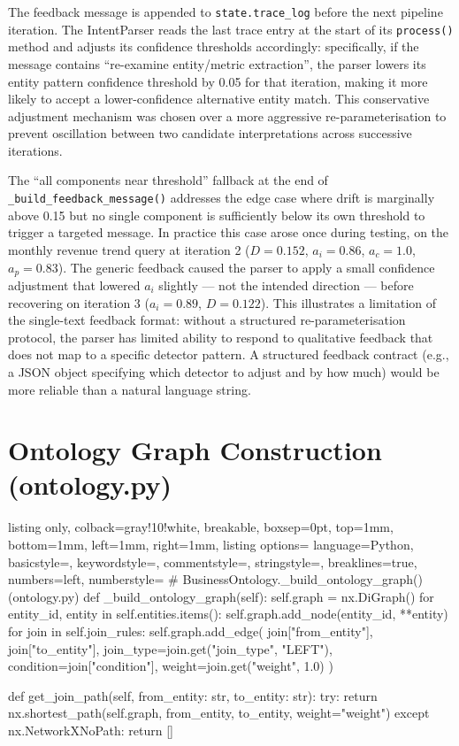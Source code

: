 \documentclass[12pt,a4paper]{report}
\begin{document}
The feedback message is appended to \texttt{state.trace\_log} before the next pipeline iteration. The IntentParser reads the last trace entry at the start of its \texttt{process()} method and adjusts its confidence thresholds accordingly: specifically, if the message contains ``re-examine entity/metric extraction'', the parser lowers its entity pattern confidence threshold by 0.05 for that iteration, making it more likely to accept a lower-confidence alternative entity match. This conservative adjustment mechanism was chosen over a more aggressive re-parameterisation to prevent oscillation between two candidate interpretations across successive iterations.

The ``all components near threshold'' fallback at the end of \texttt{\_build\_feedback\_message()} addresses the edge case where drift is marginally above 0.15 but no single component is sufficiently below its own threshold to trigger a targeted message. In practice this case arose once during testing, on the monthly revenue trend query at iteration 2 ($D = 0.152$, $a_i = 0.86$, $a_c = 1.0$, $a_p = 0.83$). The generic feedback caused the parser to apply a small confidence adjustment that lowered $a_i$ slightly — not the intended direction — before recovering on iteration 3 ($a_i = 0.89$, $D = 0.122$). This illustrates a limitation of the single-text feedback format: without a structured re-parameterisation protocol, the parser has limited ability to respond to qualitative feedback that does not map to a specific detector pattern. A structured feedback contract (e.g., a JSON object specifying which detector to adjust and by how much) would be more reliable than a natural language string.

\section{Ontology Graph Construction (ontology.py)}

\begin{tcblisting}{listing only, colback=gray!10!white, breakable, boxsep=0pt,
  top=1mm, bottom=1mm, left=1mm, right=1mm,
  listing options={
    language=Python, basicstyle=\small\ttfamily,
    keywordstyle=\color{kwcolor}, commentstyle=\color{cmtcolor},
    stringstyle=\color{strcolor}, breaklines=true,
    numbers=left, numberstyle=\tiny\color{gray}}}
# BusinessOntology._build_ontology_graph() (ontology.py)
def _build_ontology_graph(self):
    self.graph = nx.DiGraph()
    for entity_id, entity in self.entities.items():
        self.graph.add_node(entity_id, **entity)
    for join in self.join_rules:
        self.graph.add_edge(
            join["from_entity"], join["to_entity"],
            join_type=join.get("join_type", "LEFT"),
            condition=join["condition"],
            weight=join.get("weight", 1.0)
        )

def get_join_path(self, from_entity: str, to_entity: str):
    try:
        return nx.shortest_path(self.graph, from_entity, to_entity,
                                weight="weight")
    except nx.NetworkXNoPath:
        return []
\end{tcblisting}

\end{document}

